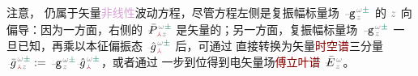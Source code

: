 注意， 仍属于矢量\textcolor{Plum}{非线性}波动方程，尽管方程左侧是\textcolor{PineGreen}{复振幅}标量场 $\Xint{\begin{smallmatrix} ~ \\ {}^{}_{\mathcolor{gray}{-}} \\ ~ \end{smallmatrix}}{09}{\mathtt{g}}^{\;\!\mathcolor{gray}{\omega} \textcolor{PineGreen}{\pm}}_{\;\! \mathcolor{gray}{z}}$ 的 $\mathcolor{gray}{z}$ 向偏导：因为一方面，右侧的 $\Xint{\mathcolor{gray}{-}}{25}{\bar{P}}^{\;\! \mathcolor{gray}{\omega} \textcolor{PineGreen}{\pm}}_{\;\! \textcolor{Maroon}{\Yup} \mathcolor{gray}{z}}$ 是矢量的；另一方面，\textcolor{PineGreen}{复振幅}标量场 $\Xint{\begin{smallmatrix} ~ \\ {}^{}_{\mathcolor{gray}{-}} \\ ~ \end{smallmatrix}}{09}{\mathtt{g}}^{\;\!\mathcolor{gray}{\omega} \textcolor{PineGreen}{\pm}}_{\;\! \mathcolor{gray}{z}}$ 一旦已知，再乘以\textcolor{PineGreen}{本征偏振态} $\Xint{{}^{}_{\mathcolor{gray}{-}}}{10}{\hat{g}}^{\;\!\mathcolor{gray}{\omega} \textcolor{PineGreen}{\pm}}_{\;\! \textcolor{Maroon}{\Yup}}$ 后，可通过  直接转换为矢量\textcolor{Maroon}{时空谱}三分量 $\Xint{{}^{}_{\mathcolor{gray}{-}}}{10}{\bar{g}}^{\;\!\mathcolor{gray}{\omega} \textcolor{PineGreen}{\pm}}_{\;\! \textcolor{Maroon}{\Yup} \mathcolor{gray}{z}} := \Xint{\begin{smallmatrix} ~ \\ {}^{}_{\mathcolor{gray}{-}} \\ ~ \end{smallmatrix}}{09}{\mathtt{g}}^{\;\!\mathcolor{gray}{\omega} \textcolor{PineGreen}{\pm}}_{\;\! \mathcolor{gray}{z}} \Xint{{}^{}_{\mathcolor{gray}{-}}}{10}{\hat{g}}^{\;\!\mathcolor{gray}{\omega} \textcolor{PineGreen}{\pm}}_{\;\! \textcolor{Maroon}{\Yup}}$，或者通过  一步到位得到电矢量场\textcolor{Maroon}{傅立叶谱} $\Xint{\mathcolor{gray}{-}}{25}{\bar{E}}^{\;\!\mathcolor{gray}{\omega}}_{\;\! \mathcolor{gray}{z}}$。

